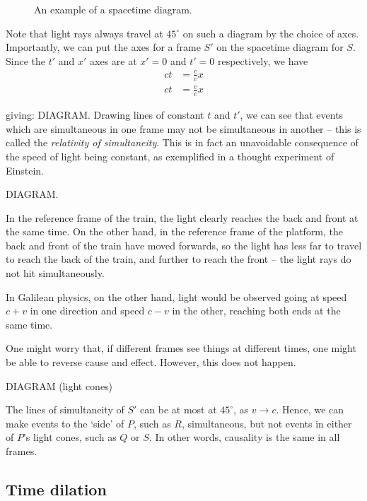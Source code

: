 \documentclass{../../template/note}
\begin{document}
    \begin{figure}[ht]
        \centering
        \caption{An example of a spacetime diagram.}
        \label{fig:spacetime-diagram}
    \end{figure}
    
    Note that light rays always travel at \(45^{\circ}\) on such a diagram by the choice of axes. Importantly, we can put the axes for a frame \(S'\) on the spacetime diagram for \(S\). Since the \(t'\) and \(x'\) axes are at \(x'=0\) and \(t'=0\) respectively, we have
    \begin{align*}
        ct &= \frac c v x \\
        ct &= \frac v c x
    \end{align*}


    giving:
    DIAGRAM.
    Drawing lines of constant \(t\) and \(t'\), we can see that events which are simultaneous in one frame may not be simultaneous in another -- this is called the \emph{relativity of simultaneity}. This is in fact an unavoidable consequence of the speed of light being constant, as exemplified in a thought experiment of Einstein.

    DIAGRAM.

    In the reference frame of the train, the light clearly reaches the back and front at the same time. On the other hand, in the reference frame of the platform, the back and front of the train have moved forwards, so the light has less far to travel to reach the back of the train, and further to reach the front -- the light rays do not hit simultaneously.
    
    In Galilean physics, on the other hand, light would be observed going at speed \(c+v\) in one direction and speed \(c-v\) in the other, reaching both ends at the same time.

    One might worry that, if different frames see things at different times, one might be able to reverse cause and effect. However, this does not happen.

    DIAGRAM (light cones)

    The lines of simultaneity of \(S'\) can be at most at \(45^\circ\), as \(v \to c\). Hence, we can make events to the `side' of \(P\), such as \(R\), simultaneous, but not events in either of \(P\)'s light cones, such as \(Q\) or \(S\). In other words, causality is the same in all frames.

    \subsection{Time dilation}
\end{document}
